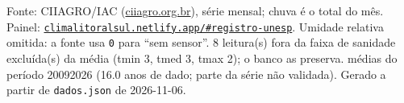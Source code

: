 \documentclass[10pt,a4paper]{article}
\begin{document}
\vspace{1pt}
{\tiny\color{cinza}
Fonte: CIIAGRO/IAC (\href{http://ciiagro.org.br}{ciiagro.org.br}), série mensal;
chuva é o total do mês. Painel:
\href{https://climalitoralsul.netlify.app/\#registro-unesp}%
{\texttt{climalitoralsul.netlify.app/\#registro-unesp}}.
Umidade relativa omitida: a fonte usa \texttt{0} para ``sem sensor''.  8 leitura(s) fora da faixa de sanidade excluída(s) da média (tmin 3, tmed 3, tmax 2); o banco as preserva.
médias do período 2009\textendash{}2026 (16.0 anos de dado; parte da série não validada).
Gerado a partir de \texttt{dados.json} de 2026-11-06.}
\end{document}
